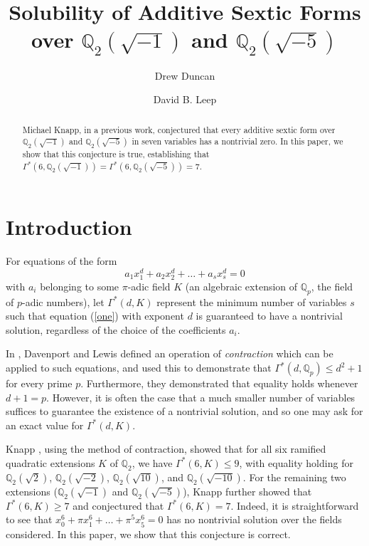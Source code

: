 \documentclass{article}
\title{Solubility of Additive Sextic Forms over $\mathbb{Q}_2(\sqrt{-1})$ and $\mathbb{Q}_2(\sqrt{-5})$}
\author{Drew Duncan \and David B. Leep}
\begin{document}
\maketitle

\begin{abstract}


Michael Knapp, in a previous work, conjectured that every additive sextic form over $\mathbb{Q}_2(\sqrt{-1})$ and $\mathbb{Q}_2(\sqrt{-5})$ in seven variables has a nontrivial zero. In this paper, we show that this conjecture is true, establishing that $\Gamma^*(6, \mathbb{Q}_2(\sqrt{-1})) = \Gamma^*(6, \mathbb{Q}_2(\sqrt{-5})) = 7 $.
\end{abstract}

\section{Introduction}
For equations of the form
\begin{equation}
\label{one}
a_1x_1^d + a_2x_2^d + \ldots + a_sx_s^d = 0
\end{equation}
with $a_i$ belonging to some $\pi$-adic field $K$ (an algebraic extension of $\mathbb{Q}_p$, the field of $p$-adic numbers), let $\Gamma^*(d, K)$ represent the minimum number of variables $s$ such that equation (\ref{one}) with exponent $d$ is guaranteed to have a nontrivial solution, regardless of the choice of the coefficients $a_i$.

In \cite{davenport1963homogeneous}, Davenport and Lewis defined an operation of \textit{contraction} which can be applied to such equations, and used this to demonstrate that $\Gamma^*(d, \mathbb{Q}_p) \le d^2+1$ for every prime $p$.  Furthermore, they demonstrated that equality holds whenever $d+1 = p$.  However, it is often the case that a much smaller number of variables suffices to guarantee the existence of a nontrivial solution, and so one may ask for an exact value for $\Gamma^*(d, K).$

Knapp \cite{knapp2016solubility}, using the method of contraction, showed that for all six ramified quadratic extensions $K$ of $\mathbb{Q}_2$, we have $\Gamma^*(6,K) \le 9$, with equality holding for $\mathbb{Q}_2(\sqrt{2})$, $\mathbb{Q}_2(\sqrt{-2})$, $\mathbb{Q}_2(\sqrt{10})$, and $\mathbb{Q}_2(\sqrt{-10})$.  For the remaining two extensions ($\mathbb{Q}_2(\sqrt{-1})$ and $\mathbb{Q}_2(\sqrt{-5})$), Knapp further showed that $\Gamma^*(6,K) \ge 7$ and conjectured that $\Gamma^*(6,K) = 7$.  Indeed, it is straightforward to see that $x_0^6 + \pi x_1^6 + \ldots + \pi^5 x_5^6 = 0$ has no nontrivial solution over the fields considered.  In this paper, we show that this conjecture is correct.
\end{document}
